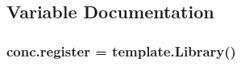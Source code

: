 \subsection{Variable Documentation}
\subsubsection[{\texorpdfstring{register}{register}}]{\setlength{\rightskip}{0pt plus 5cm}conc.\+register = template.\+Library()}\hypertarget{namespaceconc_a1e63b26f337775b699326915244ebb96}{}\label{namespaceconc_a1e63b26f337775b699326915244ebb96}
